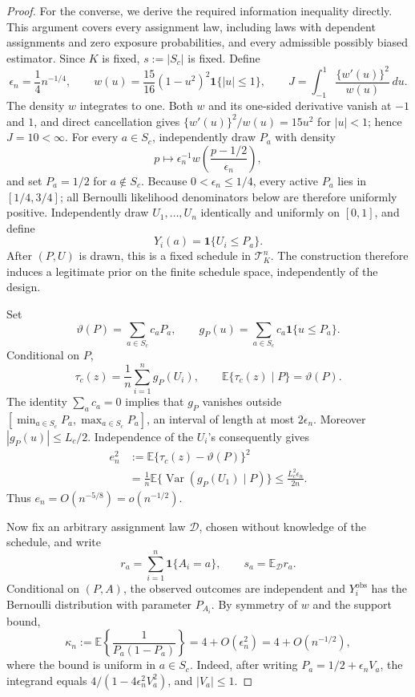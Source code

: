 \documentclass{article}
\begin{document}
\begin{proof}
For the converse, we derive the required information inequality directly.
This argument covers every assignment law, including laws with dependent
assignments and zero exposure probabilities, and every admissible possibly
biased estimator.  Since \(K\) is fixed, \(s:=|S_c|\) is fixed.  Define
\[
 \epsilon_n=\frac14n^{-1/4},
 \qquad
 w(u)=\frac{15}{16}(1-u^2)^2\mathbf 1\{|u|\le1\},
 \qquad
 J=\int_{-1}^1\frac{\{w'(u)\}^2}{w(u)}\,du.
\]
The density \(w\) integrates to one.  Both \(w\) and its one-sided
derivative vanish at \(-1\) and \(1\), and direct cancellation gives
\(\{w'(u)\}^2/w(u)=15u^2\) for \(|u|<1\); hence \(J=10<\infty\).
For every \(a\in S_c\), independently draw \(P_a\) with density
\[
 p\longmapsto \epsilon_n^{-1}
 w\!\left(\frac{p-1/2}{\epsilon_n}\right),
\]
and set \(P_a=1/2\) for \(a\notin S_c\).  Because
\(0<\epsilon_n\le1/4\), every active \(P_a\) lies in \([1/4,3/4]\);
all Bernoulli likelihood denominators below are therefore uniformly
positive.  Independently draw \(U_1,\ldots,U_n\) identically and uniformly
on \([0,1]\), and define
\[
 Y_i(a)=\mathbf 1\{U_i\le P_a\}.
\]
After \((P,U)\) is drawn, this is a fixed schedule in
\(\mathcal T_K^n\).  The construction therefore induces a legitimate
prior on the finite schedule space, independently of the design.

Set
\[
 \vartheta(P)=\sum_{a\in S_c}c_aP_a,
 \qquad
 g_P(u)=\sum_{a\in S_c}c_a\mathbf 1\{u\le P_a\}.
\]
Conditional on \(P\),
\[
 \tau_c(z)=\frac1n\sum_{i=1}^ng_P(U_i),
 \qquad
 \mathbb E\{\tau_c(z)\mid P\}=\vartheta(P).
\]
The identity \(\sum_a c_a=0\) implies that \(g_P\) vanishes outside
\([\min_{a\in S_c}P_a,\max_{a\in S_c}P_a]\), an interval of length at
most \(2\epsilon_n\).  Moreover \(|g_P(u)|\le L_c/2\).  Independence of
the \(U_i\)'s consequently gives
\[
 \begin{aligned}
 e_n^2
 &:=\mathbb E\{\tau_c(z)-\vartheta(P)\}^2\\
 &=\frac1n\mathbb E\{\operatorname{Var}(g_P(U_1)\mid P)\}
 \le\frac{L_c^2\epsilon_n}{2n}.
 \end{aligned}
\]
Thus \(e_n=O(n^{-5/8})=o(n^{-1/2})\).

Now fix an arbitrary assignment law \(\mathcal D\), chosen without
knowledge of the schedule, and write
\[
 r_a=\sum_{i=1}^n\mathbf 1\{A_i=a\},
 \qquad
 s_a=\mathbb E_{\mathcal D}r_a.
\]
Conditional on \((P,A)\), the observed outcomes are independent and
\(Y_i^{\mathrm{obs}}\) has the Bernoulli distribution with parameter
\(P_{A_i}\).  By symmetry of \(w\) and the support bound,
\[
 \kappa_n
 :=\mathbb E\!\left\{\frac1{P_a(1-P_a)}\right\}
 =4+O(\epsilon_n^2)=4+O(n^{-1/2}),
\]
where the bound is uniform in \(a\in S_c\).  Indeed, after writing
\(P_a=1/2+\epsilon_n V_a\), the integrand equals
\(4/(1-4\epsilon_n^2V_a^2)\), and \(|V_a|\le1\).


\end{proof}
\end{document}
